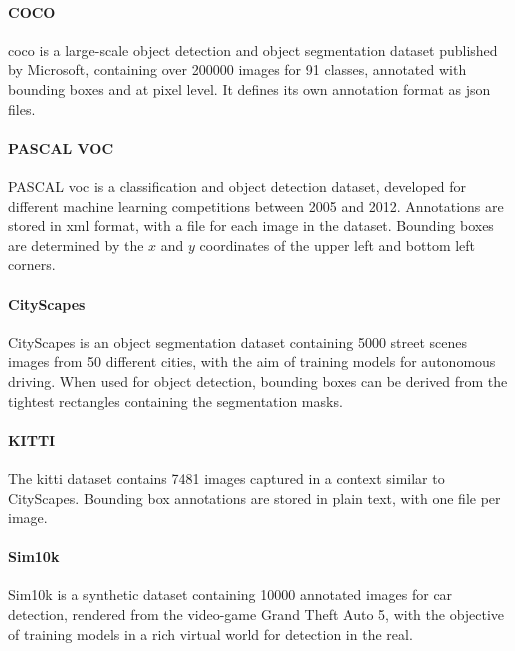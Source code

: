 \documentclass[%
    corpo=12pt,
    twoside,
    stile=classica,   
    tipotesi=magistrale,
    evenboxes,
    english
]{toptesi}
\begin{document}
\paragraph{COCO}\label{sec:coco}
\gls{coco} is a large-scale object detection and object segmentation dataset published by Microsoft, containing over 200000 images for 91 classes, annotated with bounding boxes and at pixel level\cite{lin2015microsoft}. It defines its own annotation format as \acrshort{json} files.

\paragraph{PASCAL VOC}
PASCAL \gls{voc} is a classification and object detection dataset, developed for different machine learning competitions between 2005 and 2012\cite{voc}. Annotations are stored in \acrshort{xml} format, with a file for each image in the dataset. Bounding boxes are determined by the $x$ and $y$ coordinates of the upper left and bottom left corners.

\paragraph{CityScapes}
CityScapes is an object segmentation dataset containing 5000 street scenes images from 50 different cities, with the aim of training models for autonomous driving\cite{cordts2016cityscapes}. When used for object detection, bounding boxes can be derived from the tightest rectangles containing the segmentation masks.

\paragraph{KITTI}
The \gls{kitti} dataset\cite{Geiger2013IJRR} contains 7481 images captured in a context similar to CityScapes. Bounding box annotations are stored in plain text, with one file per image.

\paragraph{Sim10k}
Sim10k is a synthetic dataset containing 10000 annotated images for car detection, rendered from the video-game Grand Theft Auto 5, with the objective of training models in a rich virtual world for detection in the real\cite{johnsonroberson2017driving}.
\end{document}
